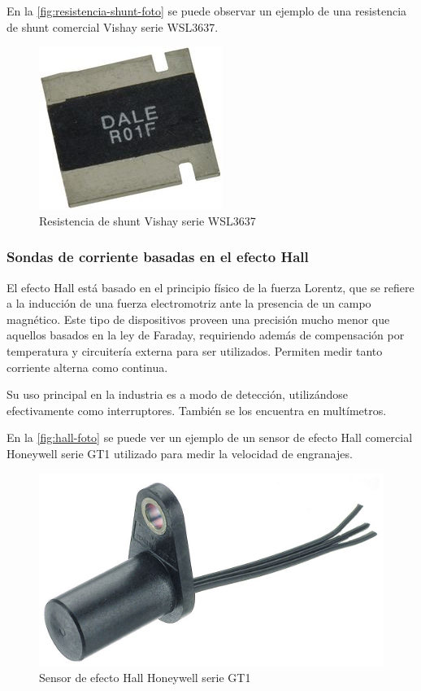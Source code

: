 \documentclass[../informe.tex]{subfiles}
\begin{document}
  En la \autoref{fig:resistencia-shunt-foto} se puede observar un ejemplo de una resistencia de shunt comercial Vishay serie WSL3637.

      \begin{figure}[!htbp]
          \centering
          \includegraphics[scale=0.5]{images/resistencia-shunt-foto.jpg}
          \caption{Resistencia de shunt Vishay serie WSL3637}
          \label{fig:resistencia-shunt-foto}
      \end{figure}

  \subsubsection{Sondas de corriente basadas en el efecto Hall}
  El efecto Hall está basado en el principio físico de la fuerza Lorentz, que se refiere a la inducción de una fuerza electromotriz ante la presencia de un campo magnético. Este tipo de dispositivos proveen una precisión mucho menor que aquellos basados en la ley de Faraday, requiriendo además de compensación por temperatura y circuitería externa para ser utilizados. Permiten medir tanto corriente alterna como continua.

  Su uso principal en la industria es a modo de detección, utilizándose efectivamente como interruptores. También se los encuentra en multímetros.

  En la \autoref{fig:hall-foto} se puede ver un ejemplo de un sensor de efecto Hall comercial Honeywell serie GT1 utilizado para medir la velocidad de engranajes.

      \begin{figure}[!htbp]
          \centering
          \includegraphics[scale=0.15]{images/hall-foto.jpg}
          \caption{Sensor de efecto Hall Honeywell serie GT1}
          \label{fig:hall-foto}
      \end{figure}
\end{document}
